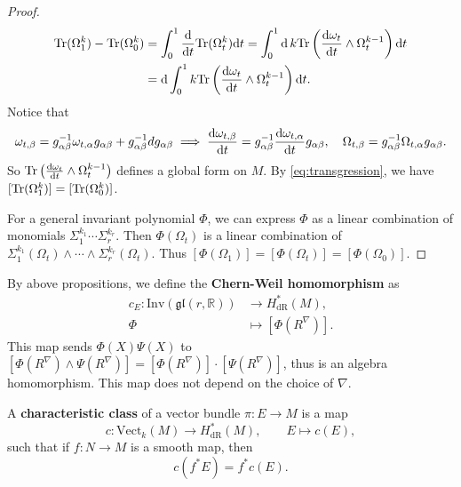 \begin{proof}
\begin{align}
        {\rm Tr}(\Omega_1^k) - {\rm Tr}(\Omega_0^k) 
        &= \int_0^1 \frac{\mathrm{d} }{\mathrm{d} t}{\rm Tr}(\Omega_t^k) {\rm d} t 
        = \int_0^1 {\rm d}\, k{\rm Tr}\left(\frac{\mathrm{d} \omega_t}{\mathrm{d} t}\wedge\Omega_t^{k-1}\right) {\rm d} t \notag\\
        &= {\rm d}\int_0^1 k{\rm Tr}\left(\frac{\mathrm{d} \omega_t}{\mathrm{d} t}\wedge\Omega_t^{k-1}\right) {\rm d} t. 
    \end{align}
    Notice that 
    \begin{equation*}
        \omega_{t,\beta} = g_{\alpha\beta}^{-1}\omega_{t,\alpha} g_{\alpha\beta} 
        + g_{\alpha\beta}^{-1}dg_{\alpha\beta} \implies 
        \frac{\mathrm{d} \omega_{t,\beta}}{\mathrm{d} t} = g_{\alpha\beta}^{-1}\frac{\mathrm{d} \omega_{t,\alpha}}{\mathrm{d} t} g_{\alpha\beta},\quad
        \Omega_{t,\beta} = g_{\alpha\beta}^{-1}\Omega_{t,\alpha} g_{\alpha\beta}.
    \end{equation*} 
    So ${\rm Tr}\left(\frac{\mathrm{d} \omega_t}{\mathrm{d} t}\wedge\Omega_t^{k-1}\right)$
    defines a global form on $M$. By \eqref{eq:transgression}, 
    we have $[{\rm Tr}(\Omega_1^k)] = [{\rm Tr}(\Omega_0^k)]$. 

    For a general invariant polynomial $\Phi$, 
    we can express $\Phi$ as a linear combination of monomials $\Sigma_1^{k_1}\cdots\Sigma_r^{k_r}$. 
    Then $\Phi(\Omega_t)$ is a linear combination of $\Sigma_1^{k_1}(\Omega_t)\wedge\cdots\wedge\Sigma_r^{k_r}(\Omega_t)$. 
    Thus $[\Phi(\Omega_1)] = [\Phi(\Omega_t)] = [\Phi(\Omega_0)]$. 
\end{proof}

\begin{definition}
    By above propositions,
    we define the \textbf{Chern-Weil homomorphism} as 
    \begin{align*}
        c_E:\mathrm{Inv}(\mathfrak{gl}(r,\mathbb{R})) &\to H_{\mathrm{dR}}^{*}(M), \\
        \Phi &\mapsto [\Phi(R^\nabla)].
    \end{align*}
    This map sends $\Phi(X)\Psi(X)$ to $[\Phi(R^\nabla)\wedge\Psi(R^\nabla)] = [\Phi(R^\nabla)]\cdot[\Psi(R^\nabla)]$, 
    thus is an algebra homomorphism. This map does not depend on the choice of $\nabla$. 
\end{definition}

\begin{definition} %
    A \textbf{characteristic class} of a vector bundle $\pi:E\to M$ is a map 
    \begin{equation*}
        c:\mathrm{Vect}_k(M)\to H_{\mathrm{dR}}^{*}(M), \qquad E\mapsto c(E),
    \end{equation*} 
    such that if $f:N\to M$ is a smooth map, then 
    \begin{equation*}
        c(f^*E) = f^*c(E).
    \end{equation*}
\end{definition}

